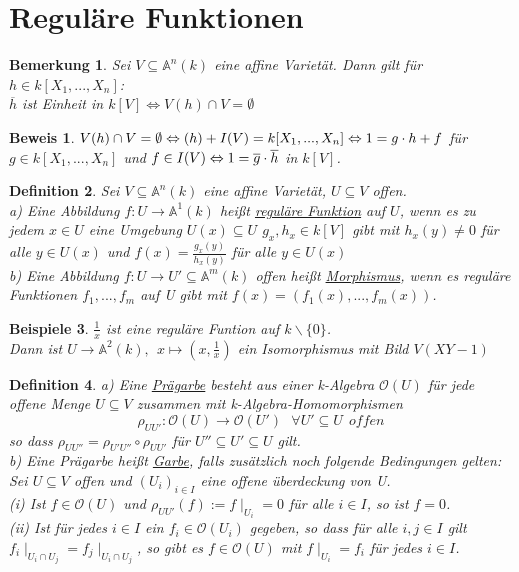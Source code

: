 \documentclass[a4paper,12pt]{report}
\theoremstyle{break}
\newtheorem{Def}{Definition}[chapter]
\newtheorem{Bem}[Def]{Bemerkung}
\newtheorem{Bsp}[Def]{Beispiele}
\theoremstyle{nonumberbreak}
\newtheorem{Bew}{Beweis}
\theoremstyle{nonumberplain}
\begin{document}
\section{Reguläre Funktionen}
\begin{Bem}
Sei $V\subseteq\mathbb{A}^n(k)$ eine affine Varietät. Dann gilt für $h\in k[X_1,...,X_n]$:\\
$\overline{h}$ ist Einheit in $k[V]\Leftrightarrow V(h)\cap V = \emptyset$
\end{Bem}
\begin{Bew} $V(h)\cap V = \emptyset \Leftrightarrow (h)+I(V)=k[X_1,...,X_n]\\
\Leftrightarrow1=g\cdot h+f$ für $g\in k[X_1,...,X_n]$ und $f\in I(V)\\
\Leftrightarrow 1= \overline{g}\cdot\overline{h}$ in $k[V]$.
\end{Bew}
\begin{Def}
Sei $V\subseteq\mathbb{A}^n(k)$ eine affine Varietät, $U\subseteq V$ offen.\\
a) Eine Abbildung $f: U\rightarrow \mathbb{A}^1(k)$ heißt \underline{reguläre Funktion} auf $U$, wenn es zu jedem $x\in U$ eine Umgebung $U(x)\subseteq U$
$g_x,h_x\in k[V]$ gibt mit $h_x(y)\neq0$ für alle $y\in U(x)$ und $f(x)=\frac{g_x(y)}{h_x(y)}$ für alle $y\in U(x)$\\
b) Eine Abbildung $f: U\rightarrow U'\subseteq \mathbb{A}^m(k)$ offen heißt \underline{Morphismus}, wenn es reguläre Funktionen $f_1,...,f_m$ auf U gibt mit $f(x)=(f_1(x),...,f_m(x))$.
\end{Def}
\begin{Bsp} $\frac{1}{x}$ ist eine reguläre Funtion auf $k\backslash\{0\}$.\\
Dann ist $U\rightarrow \mathbb{A}^2(k), ~~x\mapsto(x,\frac{1}{x})$ ein Isomorphismus mit Bild $V(XY-1)$
\end{Bsp}
\begin{Def}
a) Eine \underline{Prägarbe} besteht aus einer k-Algebra $\mathcal{O}(U)$ für jede offene Menge $U\subseteq V$ zusammen mit k-Algebra-Homomorphismen
$$\rho_{UU'}: \mathcal{O}(U)\rightarrow \mathcal{O}(U') ~~~\forall U'\subseteq U~~offen$$
so dass $\rho_{UU''}=\rho_{U'U''}\circ\rho_{UU'}$ für $U''\subseteq U'\subseteq U$ gilt.\\
b) Eine Prägarbe heißt \underline{Garbe}, falls zusätzlich noch folgende Bedingungen gelten:\\
Sei $U\subseteq V$ offen und $(U_i)_{i\in I}$ eine offene überdeckung von U.\\
(i) Ist $f\in \mathcal{O}(U)$ und $\rho_{UU'}(f):= f\mid_{U_i} = 0$ für alle $i\in I$, so ist $f=0$.\\
(ii) Ist für jedes $i\in I$ ein $f_i\in \mathcal{O}(U_i)$ gegeben, so dass für alle $i,j\in I$ gilt $f_i\mid_{U_i\cap U_j}=f_j\mid_{U_i\cap U_j}$, so gibt es $f\in \mathcal{O}(U)$ mit $f\mid_{U_i}=f_i$ für jedes $i\in I$.
\end{Def}
\end{document}
